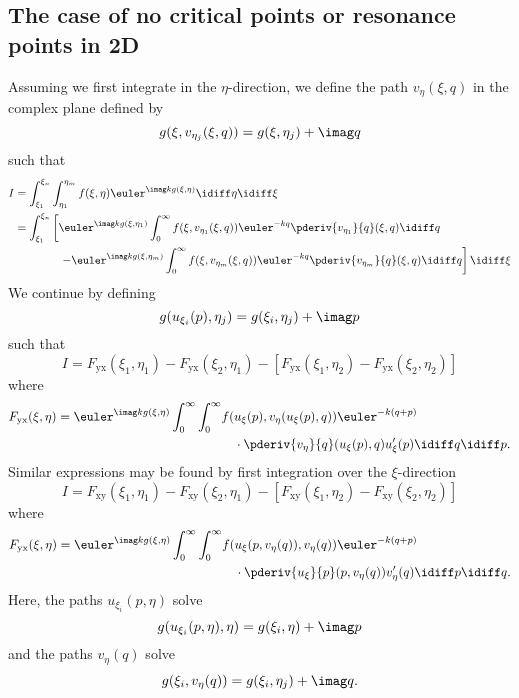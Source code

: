 \subsection{The case of no critical points or resonance points in 2D}
Assuming we first integrate in the $\eta$-direction, we define the path $v_\eta(\xi,q)$ in the complex plane defined by
\begin{equation*}
	g(\xi,v_{\eta_j}(\xi,q))=g(\xi,\eta_j)+\imag q
\end{equation*}
such that
\begin{align*}
	I &= \int_{\xi_1}^{\xi_n}\int_{\eta_1}^{\eta_m} f(\xi,\eta)\euler^{\imag k g(\xi,\eta)}\idiff\eta\idiff \xi\\
	&=\int_{\xi_1}^{\xi_n}\left[\euler^{\imag k g(\xi,\eta_1)}\int_0^\infty f(\xi,v_{\eta_1}(\xi,q))\euler^{-k q}\pderiv{v_{\eta_1}}{q}(\xi,q)\idiff q\right.\\
	&{\hskip4em\relax}\left. -\euler^{\imag k g(\xi,\eta_m)}\int_0^\infty f(\xi,v_{\eta_m}(\xi,q))\euler^{-k q}\pderiv{v_{\eta_m}}{q}(\xi,q)\idiff q\right]\idiff \xi
\end{align*}
We continue by defining
\begin{equation*}
	g(u_{\xi_i}(p),\eta_j)=g(\xi_i,\eta_j)+\imag p
\end{equation*}
such that
\begin{equation*}
	I = F_{\mathrm{yx}}(\xi_1,\eta_1) - F_{\mathrm{yx}}(\xi_2,\eta_1) - \left[F_{\mathrm{yx}}(\xi_1,\eta_2)-F_{\mathrm{yx}}(\xi_2,\eta_2)\right]
\end{equation*}
where
\begin{equation}\label{Eq4:F_yx}
\begin{aligned}
	F_{\mathrm{yx}}(\xi,\eta) = \euler^{\imag k g(\xi,\eta)}\int_0^\infty\int_0^\infty &f(u_\xi(p),v_{\eta}(u_{\xi}(p),q))\euler^{-k (q+p)}\\
	&{\hskip1em\relax}\cdot\pderiv{v_\eta}{q}(u_{\xi}(p),q)u_\xi'(p)\idiff q\idiff p.
\end{aligned}
\end{equation}
Similar expressions may be found by first integration over the $\xi$-direction
\begin{equation*}
	I = F_{\mathrm{xy}}(\xi_1,\eta_1) - F_{\mathrm{xy}}(\xi_2,\eta_1) - \left[F_{\mathrm{xy}}(\xi_1,\eta_2)-F_{\mathrm{xy}}(\xi_2,\eta_2)\right]
\end{equation*}
where
\begin{equation}\label{Eq4:F_xy}
\begin{aligned}
	F_{\mathrm{yx}}(\xi,\eta) = \euler^{\imag k g(\xi,\eta)}\int_0^\infty\int_0^\infty &f(u_\xi(p,v_{\eta}(q)),v_{\eta}(q))\euler^{-k (q+p)}\\
	&{\hskip1em\relax}\cdot\pderiv{u_\xi}{p}(p,v_{\eta}(q))v_\eta'(q)\idiff p\idiff q.
\end{aligned}
\end{equation}
Here, the paths $u_{\xi_i}(p,\eta)$ solve
\begin{equation*}
	g(u_{\xi_i}(p,\eta),\eta) = g(\xi_i,\eta) + \imag p
\end{equation*}
and the paths $v_{\eta}(q)$ solve
\begin{equation*}
	g(\xi_i, v_{\eta}(q)) = g(\xi_i,\eta_j) + \imag q.
\end{equation*}


